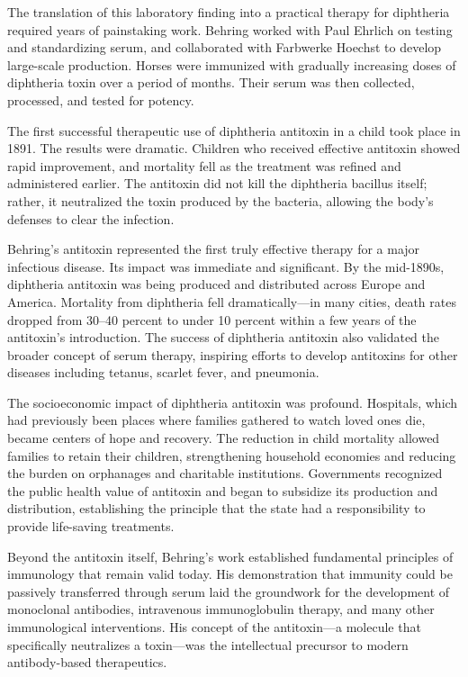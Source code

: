 The translation of this laboratory finding into a practical therapy for diphtheria required years of painstaking work. Behring worked with Paul Ehrlich on testing and standardizing serum, and collaborated with Farbwerke Hoechst to develop large-scale production. Horses were immunized with gradually increasing doses of diphtheria toxin over a period of months. Their serum was then collected, processed, and tested for potency.\cite{nobel-history}

The first successful therapeutic use of diphtheria antitoxin in a child took place in 1891. The results were dramatic. Children who received effective antitoxin showed rapid improvement, and mortality fell as the treatment was refined and administered earlier. The antitoxin did not kill the diphtheria bacillus itself; rather, it neutralized the toxin produced by the bacteria, allowing the body's defenses to clear the infection.\cite{nobel-history,lecture-1901}

Behring's antitoxin represented the first truly effective therapy for a major infectious disease. Its impact was immediate and significant. By the mid-1890s, diphtheria antitoxin was being produced and distributed across Europe and America. Mortality from diphtheria fell dramatically---in many cities, death rates dropped from 30--40 percent to under 10 percent within a few years of the antitoxin's introduction. The success of diphtheria antitoxin also validated the broader concept of serum therapy, inspiring efforts to develop antitoxins for other diseases including tetanus, scarlet fever, and pneumonia.

The socioeconomic impact of diphtheria antitoxin was profound. Hospitals, which had previously been places where families gathered to watch loved ones die, became centers of hope and recovery. The reduction in child mortality allowed families to retain their children, strengthening household economies and reducing the burden on orphanages and charitable institutions. Governments recognized the public health value of antitoxin and began to subsidize its production and distribution, establishing the principle that the state had a responsibility to provide life-saving treatments.

Beyond the antitoxin itself, Behring's work established fundamental principles of immunology that remain valid today. His demonstration that immunity could be passively transferred through serum laid the groundwork for the development of monoclonal antibodies, intravenous immunoglobulin therapy, and many other immunological interventions. His concept of the antitoxin---a molecule that specifically neutralizes a toxin---was the intellectual precursor to modern antibody-based therapeutics.

